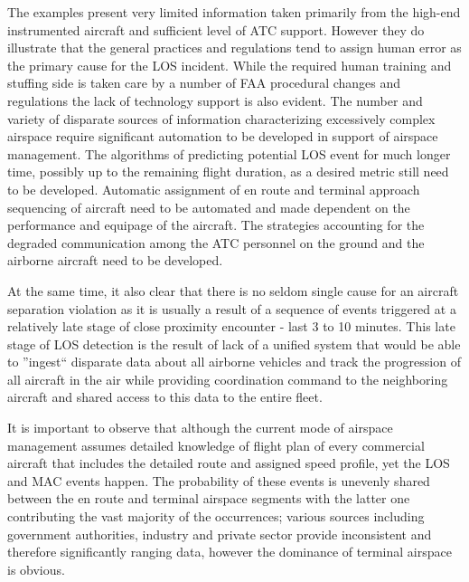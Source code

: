\documentclass[letter,onecolumn,12pt]{aiaa-tc}
\newcommand{\1}{1_n}
\begin{document}
The examples present very limited information taken primarily from the high-end instrumented aircraft and sufficient level of ATC support. However they do illustrate that the general practices and regulations tend to assign human error as the primary cause for the LOS incident. While the required human training and stuffing side is taken care by a number of FAA procedural changes and regulations\cite{OIG_AR2013} the lack of technology support is also evident. The number and variety of disparate sources of information characterizing excessively complex airspace require significant automation to be developed in support of airspace management. The algorithms of predicting potential LOS event for much longer time, possibly up to the remaining flight duration, as a desired metric still need to be developed. Automatic assignment of en route and terminal approach sequencing of aircraft need to be automated and made dependent on the performance and equipage of the aircraft. The strategies accounting for the degraded communication among the ATC personnel on the ground and the airborne aircraft need to be developed.

At the same time, it also clear that there is no seldom single cause for an aircraft separation violation as it is usually a result of  a sequence of events triggered at a relatively late stage of close proximity encounter - last 3 to 10 minutes. This late stage of LOS detection is the result of lack of a unified system that would be able to ''ingest`` disparate data about all airborne vehicles and track the progression of all aircraft in the air while providing coordination command to the neighboring aircraft and shared access to this data to the entire fleet.

It is important to observe that although the current mode of airspace management assumes detailed knowledge of flight plan of every commercial aircraft that includes the detailed route and assigned speed profile, yet the LOS and MAC events happen. The probability of these events is unevenly shared between the en route and terminal airspace segments with the latter one contributing the vast majority of the occurrences; various sources including government authorities, industry and private sector provide inconsistent and therefore significantly ranging data, however the dominance of terminal airspace is obvious.
\end{document}
